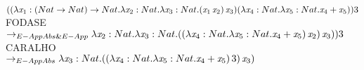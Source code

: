\documentclass{standalone}
\begin{document}
$((\lambda \mathit{x}_1: (Nat \rightarrow Nat)\rightarrow Nat.\lambda \mathit{x}_2:Nat.\lambda \mathit{x}_3: Nat . (\mathit{x}_1 \, \mathit{x}_2)\,\mathit{x}_3) (\lambda \mathit{x}_4:Nat. \lambda \mathit{x}_5:Nat. \mathit{x}_4 + \mathit{x}_5)) 3$\\
  FODASE\\
  $\rightarrow_{E-AppAbs \& E-App}\lambda \mathit{x}_2:Nat.\lambda \mathit{x}_3: Nat . ((\lambda \mathit{x}_4:Nat. \lambda \mathit{x}_5:Nat. \mathit{x}_4 + \mathit{x}_5) \, \mathit{x}_2)\,\mathit{x}_3) ) 3 $\\
  CARALHO\\
$\rightarrow_{E-AppAbs} \lambda \mathit{x}_3: Nat . ((\lambda \mathit{x}_4:Nat. \lambda \mathit{x}_5:Nat. \mathit{x}_4 + \mathit{x}_5) \, 3)\,\mathit{x}_3) $
\end{document}
